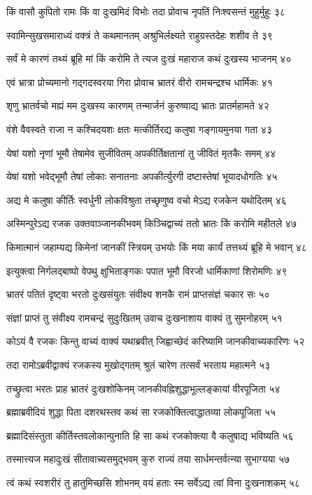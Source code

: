 किं वासौ कुपितो रामः किं वा दुःखमिदं विभोः
तदा प्रोवाच नृपतिं निःश्वसन्तं मुहुर्मुहुः ३८

स्वामिन्सुखसमाराध्यं वक्त्रं ते कथमानतम्
अश्रुभिर्लक्ष्यते राहुग्रस्तदेहः शशीव ते ३९

सर्वं मे कारणं तथ्यं ब्रूहि मां किं करोमि ते
त्यज दुःखं महाराज कथं दुःखस्य भाजनम् ४०

एवं भ्रात्रा प्रोच्यमानो गद्गदस्वरया गिरा
प्रोवाच भ्रातरं वीरो रामचन्द्रश्च धार्मिकः ४१

शृणु भ्रातर्वचो मह्यं मम दुःखस्य कारणम्
तन्मार्जनं कुरुष्वाद्य भ्रातः प्रातर्महामते ४२

वंशे वैवस्वते राजा न कश्चिदयशः क्षतः
मत्कीर्तिरद्य कलुषा गङ्गायमुनया गता ४३

येषां यशो नृणां भूमौ तेषामेव सुजीवितम्
अपकीर्तिक्षतानां तु जीवितं मृतकैः समम् ४४

येषां यशो भवेद्भूमौ तेषां लोकाः सनातनाः
अपकीर्त्युरगी दष्टास्तेषां भूयादधोगतिः ४५

अद्य मे कलुषा कीर्तिः स्वर्धुनी लोकविश्रुता
तच्छृणुष्व वचो मेऽद्य रजकेन यथोदितम् ४६

अस्मिन्पुरेऽद्य रजक उक्तवाञ्जानकीभवम्
किञ्चिद्वाच्यं ततो भ्रातः किं करोमि महीतले ४७

किमात्मानं जहाम्यद्य किमेनां जानकीं स्त्रियम्
उभयोः किं मया कार्यं तत्तथ्यं ब्रूहि मे भवान् ४८

इत्युक्त्वा निर्गलद्बाष्पो वेपथु क्षुभिताङ्गकः
पपात भूमौ विरजो धार्मिकाणां शिरोमणिः ४९

भ्रातरं पतितं दृष्ट्वा भरतो दुःखसंयुतः
संवीक्ष्य शनकै रामं प्राप्तसंज्ञं चकार सः ५०

संज्ञां प्राप्तं तु संवीक्ष्य रामचन्द्रं सुदुःखितम्
उवाच दुःखनाशाय वाक्यं तु सुमनोहरम् ५१

कोऽयं वै रजकः किन्तु वाच्यं वाक्यं यथाब्रवीत्
जिह्वाच्छेदं करिष्यामि जानकीवाच्यकारिणः ५२

तदा रामोऽब्रवीद्वाक्यं रजकस्य मुखोद्गतम्
श्रुतं चारेण तत्सर्वं भरताय महात्मने ५३

तच्छ्रुत्वा भरतः प्राह भ्रातरं दुःखशोकिनम्
जानकीवह्निशुद्धाभूल्लङ्कायां वीरपूजिता ५४

ब्रह्माब्रवीदियं शुद्धा पिता दशरथस्तव
कथं सा रजकोक्तित्वाद्धातव्या लोकपूजिता ५५

ब्रह्मादिसंस्तुता कीर्तिस्तवलोकान्पुनाति हि
सा कथं रजकोक्त्या वै कलुषाद्य भविष्यति ५६

तस्मात्त्यज महादुःखं सीतावाच्यसमुद्भवम्
कुरु राज्यं तया सार्धमन्तर्वत्न्या सुभाग्यया ५७

त्वं कथं स्वशरीरं तु हातुमिच्छसि शोभनम्
वयं हताः स्म सर्वेऽद्य त्वां विना दुःखनाशकम् ५८

